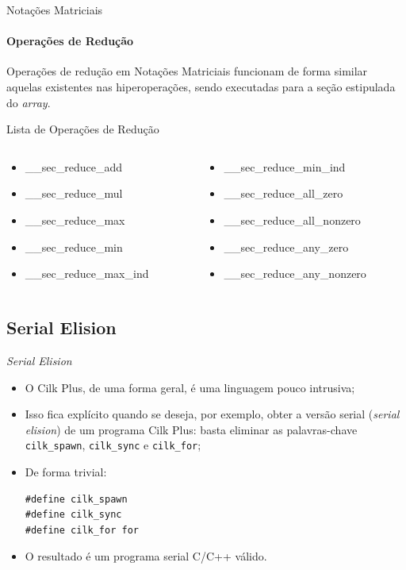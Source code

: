 \documentclass{beamer}
\begin{document}
\begin{frame}[fragile]{Notações Matriciais}
\framesubtitle{Operações de Redução}
	Operações de redução em Notações Matriciais funcionam de forma similar
	aquelas existentes nas hiperoperações, sendo executadas para a seção
	estipulada do \textit{array}.
\begin{block}{Lista de Operações de Redução}
\begin{small}
\begin{small}
\begin{columns}
\begin{column}{0.45\textwidth}
\begin{itemize}
    \item \_\_sec\_reduce\_add
    \item \_\_sec\_reduce\_mul
    \item \_\_sec\_reduce\_max
    \item \_\_sec\_reduce\_min
    \item \_\_sec\_reduce\_max\_ind
\end{itemize}
\end{column}
\begin{column}{0.45\textwidth}
\begin{itemize}
    \item \_\_sec\_reduce\_min\_ind
    \item \_\_sec\_reduce\_all\_zero
    \item \_\_sec\_reduce\_all\_nonzero
    \item \_\_sec\_reduce\_any\_zero
    \item \_\_sec\_reduce\_any\_nonzero
\end{itemize}
\end{column}
\end{columns}
\end{small}
\end{small}
\end{block}
\end{frame}

\subsection{Serial Elision}
\begin{frame}[fragile]{\textit{Serial Elision}}
\begin{itemize}
    \item O Cilk Plus, de uma forma geral, é uma linguagem pouco intrusiva;
    \item Isso fica explícito quando se deseja, por exemplo, obter a versão
    serial (\textit{serial elision}) de um programa Cilk Plus: basta eliminar as
    palavras-chave \texttt{cilk\_spawn}, \texttt{cilk\_sync} e
    \texttt{cilk\_for};
    \item De forma trivial:
\begin{lstlisting}
#define cilk_spawn
#define cilk_sync
#define cilk_for for
\end{lstlisting}
    \item O resultado é um programa serial C/C++ válido.
\end{itemize}
\end{frame}
\end{document}
